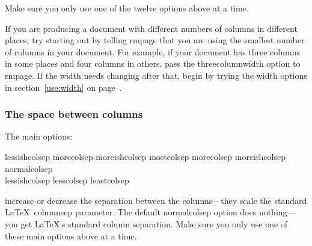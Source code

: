 \documentclass[11pt,loose,twoside,touchwider,longish,
                      noheaders,a4paper,notstdmargins]{report}
\DeclareRobustCommand*{\comname}[1]{{\ttfamily\makeatletter\bs #1\makeatother}}
\newcommand*{\classname}[1]{{\ttfamily #1}}
\newcommand*{\optname}[1]{{\ttfamily #1}}
\newcommand*{\rmpage}{\classname{rmpage}\xspace}
\begin{document}
Make sure you only use one of the twelve options above at a time.

If you are producing a document with different numbers of columns in
different places, try starting out by telling \rmpage that you are
using the smallest number of columns in your document.  For example,
if your document has three columns in some places and four columns in
others, pass the \optname{threecolumnwidth} option to \rmpage.  If the
width needs changing after that, begin by trying the \optname{width}
options in section~\ref{use:width} on page~\pageref{use:width}.

\subsubsection{The space between columns}

The main options:
\begin{tabbing}
\optname{lessishcolsep} \=   \optname{morecolsep} \=
\optname{moreishcolsep} \kill
\optname{mostcolsep} \>   \optname{morecolsep} \>
\optname{moreishcolsep} \\
\optname{normalcolsep} \\
\optname{lessishcolsep} \> \optname{lesscolsep} \> \optname{leastcolsep}
\end{tabbing}
increase or decrease the separation between the columns---they scale
the standard \LaTeX\ \comname{columnsep} parameter.  The default
\optname{normalcolsep} option does nothing---you get \LaTeX's standard
column separation.  Make sure you only use one of these main options
above at a time.
\end{document}
